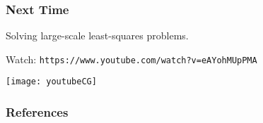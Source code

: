 \documentclass[12pt,fleqn,beamer]{beamer}
\begin{document}
\begin{frame}\frametitle{Next Time}

Solving large-scale least-squares problems.


\bigskip

Watch: \tt{https://www.youtube.com/watch?v=eAYohMUpPMA}
\begin{center}
	\texttt{[image: youtubeCG]}
\end{center}


\end{frame}




\begin{frame}[allowframebreaks]
	\frametitle{References}



\end{frame}
\end{document}
